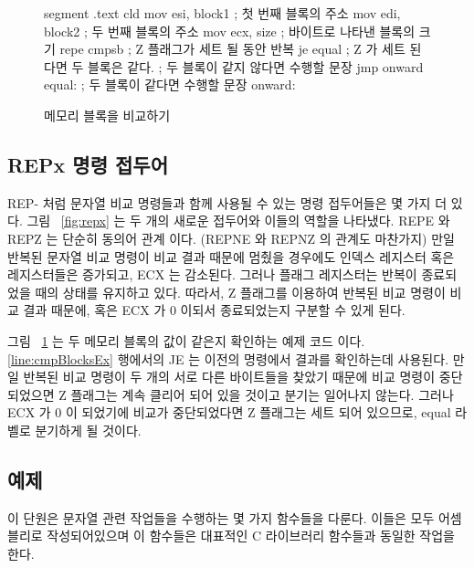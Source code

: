 \begin{figure}
\begin{AsmCodeListing}[frame=single,commandchars=\\\{\}]
segment .text
      cld
      mov    esi, block1        ; 첫 번째 블록의 주소
      mov    edi, block2        ; 두 번째 블록의 주소 
      mov    ecx, size          ; 바이트로 나타낸 블록의 크기 
      repe   cmpsb              ; Z 플래그가 세트 될 동안 반복
      je     equal              ; Z 가 세트 된다면 두 블록은 같다. \label{line:cmpBlocksEx}
   ; 두 블록이 같지 않다면 수행할 문장
      jmp    onward
equal:
   ; 두 블록이 같다면 수행할 문장
onward:
\end{AsmCodeListing}
\caption{메모리 블록을 비교하기\label{fig:cmpBlocksEx}}
\end{figure}

\subsection{{\protect\code REPx} 명령 접두어}

{\code REP}- 처럼 문자열 비교 명령들과 함께 사용될 수 있는 명령 접두어들은
몇 가지 더 있다. 그림 ~\ref{fig:repx} 는 두 개의 새로운 접두어와 이들의 역할을 나타냈다. 
{\code REPE}  와 {\code REPZ} 는 단순히 동의어 관계 이다. 
({\code REPNE} 와 {\code REPNZ} 의 관계도 마찬가지) 만일 반복된 문자열
비교 명령이 비교 결과 때문에 멈췄을 경우에도 인덱스 레지스터 혹은 레지스터들은 증가되고,
ECX 는 감소된다. 그러나 플래그 레지스터는 반복이 종료되었을 때의 상태를 유지하고
있다. 
따라서, Z 플래그를 이용하여 반복된 비교 명령이 비교 결과 때문에, 혹은 ECX 가 0 이되서 종료되었는지 
구분할 수 있게 된다. 

그림 ~\ref{fig:cmpBlocksEx} 는 두 메모리 블록의 값이 같은지 확인하는 예제 코드 이다. 
\ref{line:cmpBlocksEx} 행에서의 {\code JE} 는 이전의 명령에서 결과를 확인하는데 사용된다.
만일 반복된 비교 명령이 두 개의 서로 다른 바이트들을 찾았기 때문에 비교 명령이 중단되었으면 
Z 플래그는 계속 클리어 되어 있을 것이고 분기는 일어나지 않는다. 그러나 ECX 가 0 이 되었기에 
비교가 중단되었다면 Z 플래그는 세트 되어 있으므로, {\code equal} 라벨로 분기하게 될 것이다. 

\subsection{예제}

이 단원은 문자열 관련 작업들을 수행하는 몇 가지 함수들을 다룬다. 
이들은 모두 어셈블리로 작성되어있으며 이 함수들은 대표적인 C 라이브러리 함수들과 동일한 작업을 한다. 

